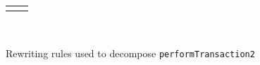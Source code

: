 \begin{figure}
{\begin{tabular}{ll}
&











\end{tabular}\\
}


\label{fig-rewritting}
\caption{Rewriting rules used to decompose \texttt{performTransaction2}}
\end{figure}







